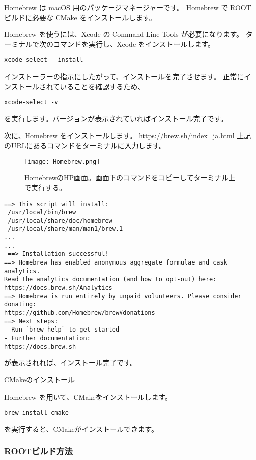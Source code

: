 \documentclass[10pt,a4j]{jarticle}
\begin{document}
Homebrew は macOS 用のパッケージマネージャーです。
Homebrew で ROOT ビルドに必要な CMake をインストールします。\par
Homebrew を使うには、Xcode の Command Line Tools が必要になります。
ターミナルで次のコマンドを実行し、Xcode をインストールします。
\begin{lstlisting}
xcode-select --install
\end{lstlisting}
インストーラーの指示にしたがって、インストールを完了させます。
正常にインストールされていることを確認するため、
\begin{lstlisting}
xcode-select -v
\end{lstlisting}
を実行します。バージョンが表示されていればインストール完了です。\par
次に、Homebrew をインストールします。
\url{https://brew.sh/index_ja.html}
上記のURLにあるコマンドをターミナルに入力します。
\begin{figure}[h]
\begin{center}
\texttt{[image: Homebrew.png]}
\caption{HomebrewのHP画面。画面下のコマンドをコピーしてターミナル上で実行する。}
\end{center}
\end{figure}
\begin{lstlisting}[caption=Homebrewインストール時のスクリプト]
==> This script will install:
 /usr/local/bin/brew
 /usr/local/share/doc/homebrew
 /usr/local/share/man/man1/brew.1
...
...
 ==> Installation successful!
==> Homebrew has enabled anonymous aggregate formulae and cask analytics.
Read the analytics documentation (and how to opt-out) here:
https://docs.brew.sh/Analytics
==> Homebrew is run entirely by unpaid volunteers. Please consider donating:
https://github.com/Homebrew/brew#donations
==> Next steps:
- Run `brew help` to get started
- Further documentation:
https://docs.brew.sh
\end{lstlisting}

が表示されれば、インストール完了です。\par

\vspace{0.5cm}
CMakeのインストール
\vspace{0.3cm}

Homebrew を用いて、CMakeをインストールします。
\begin{lstlisting}
brew install cmake
\end{lstlisting}
を実行すると、CMakeがインストールできます。

\subsubsection{ROOTビルド方法}
\end{document}
